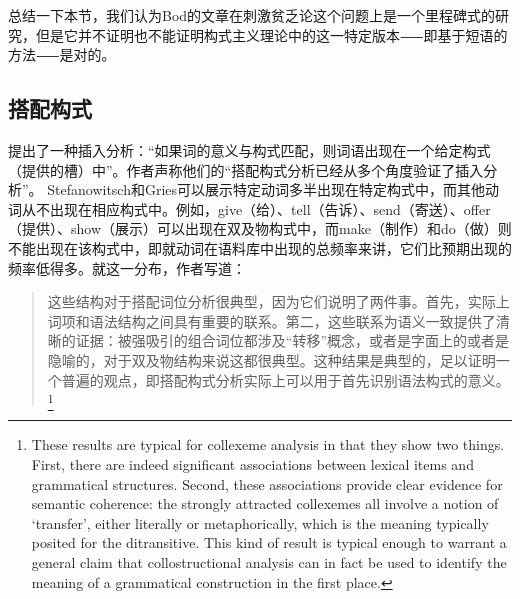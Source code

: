 \begin{exe}
\begin{xlist}[iv.]
\begin{exe}
\begin{xlist}[iv.]
总结一下本节，我们认为Bod的文章在刺激贫乏论这个问题上是一个里程碑式的研究，但是它并不证明也不能证明构式主义理论中的这一特定版本⸺即基于短语的方法⸺是对的。

\subsection{搭配构式}

\mbox{} \citet[\S~5]{SG2009a}提出了一种插入分析：“如果词的意义与构式匹配，则词语出现在一个给定构式（提供的槽）中”。作者声称他们的“搭配构式分析已经从多个角度验证了插入分析”。 Stefanowitsch和Gries可以展示特定动词多半出现在特定构式中，而其他动词从不出现在相应构式中。例如，give（给）、tell（告诉）、send（寄送）、offer（提供）、show（展示）可以出现在双及物构式中，而make（制作）和do（做）则不能出现在该构式中，即就动词在语料库中出现的总频率来讲，它们比预期出现的频率低得多。就这一分布，作者写道：
\begin{quotation}
这些结构对于搭配词位分析很典型，因为它们说明了两件事。首先，实际上词项和语法结构之间具有重要的联系。第二，这些联系为语义一致提供了清晰的证据：被强吸引的组合词位都涉及“转移”概念，或者是字面上的或者是隐喻的，对于双及物结构来说这都很典型。这种结果是典型的，足以证明一个普遍的观点，即搭配构式分析实际上可以用于首先识别语法构式的意义。\citep[]{SG2009a}\footnote{%
  These results are typical for collexeme analysis in that they show two things. First, there are
  indeed significant associations between lexical items and grammatical structures. Second, these
  associations provide clear evidence for semantic coherence: the strongly attracted collexemes all
  involve a notion of `transfer', either literally or metaphorically, which is the meaning typically
  posited for the ditransitive. This kind of result is typical enough to warrant a general claim
  that collostructional analysis can in fact be used to identify the meaning of a grammatical
  construction in the first place.
  }
\end{quotation}


\end{xlist}
\end{exe}
\end{xlist}
\end{exe}

